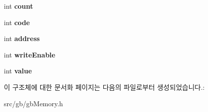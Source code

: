 \begin{DoxyCompactItemize}
int {\bfseries count}
\item 
\mbox{\label{structmapper_m_b_c7_ad7fc3ef605f742be9754778297982441}} 
int {\bfseries code}
\item 
\mbox{\label{structmapper_m_b_c7_a23b1a5a0926bb85d8e6d1fd3998914be}} 
int {\bfseries address}
\item 
\mbox{\label{structmapper_m_b_c7_a8885a4983e918c11894d242c623ee4ad}} 
int {\bfseries write\+Enable}
\item 
\mbox{\label{structmapper_m_b_c7_a2f07066b9e31c4e36abca0844e53e3dc}} 
int {\bfseries value}
\end{DoxyCompactItemize}


이 구조체에 대한 문서화 페이지는 다음의 파일로부터 생성되었습니다.\+:\begin{DoxyCompactItemize}
\item 
src/gb/gb\+Memory.\+h\end{DoxyCompactItemize}
